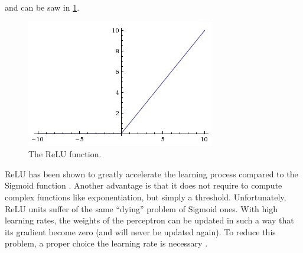 and can be saw in \cref{fig:relu}.

\begin{figure}[ht]
	\centering
	\includegraphics[scale=0.6]{figures/relu}
	\caption{The \ac{ReLU} function.}
	\label{fig:relu}
\end{figure}

\ac{ReLU} has been shown to greatly accelerate the learning process compared to the Sigmoid function \cite{krizhevsky2012imagenet}.
Another advantage is that it does not require to compute complex functions like exponentiation, but simply a threshold.
Unfortunately, \ac{ReLU} units suffer of the same ``dying'' problem of Sigmoid ones.
With high learning rates, the weights of the perceptron can be updated in such a way that its gradient become zero (and will never be updated again).
To reduce this problem, a proper choice the learning rate is necessary \cite{CS231n}.
